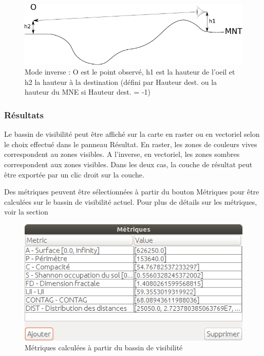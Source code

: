 \documentclass{report}
\begin{document}
\begin{figure}[H]
	\includegraphics{img/height_view_inverse.pdf} 
	\caption{Mode inverse : O est le point observé, h1 est la hauteur de l'oeil et h2 la hauteur à la destination (défini par Hauteur dest. ou la hauteur du MNE si Hauteur dest. = -1)}
	\label{height_view_inverse}	
\end{figure}

\subsubsection{Résultats}

Le bassin de visibilité peut être affiché sur la carte en raster ou en vectoriel selon le choix effectué dans le panneau Résultat. En raster, les zones de couleurs vives correspondent au zones visibles. A l'inverse, en vectoriel, les zones sombres correspondent aux zones visibles. Dans les deux cas, la couche de résultat peut être exportée par un clic droit sur la couche.

Des métriques peuvent être sélectionnées à partir du bouton Métriques pour être calculées sur le bassin de visibilité actuel. Pour plus de détails sur les métriques, voir la section 

\begin{figure}[H]
	\includegraphics[scale=0.5]{img/viewshed_metric-fr.png} 
	\caption{Métriques calculées à partir du bassin de visibilité}
	\label{viewshed_metric}
\end{figure}
\end{document}
